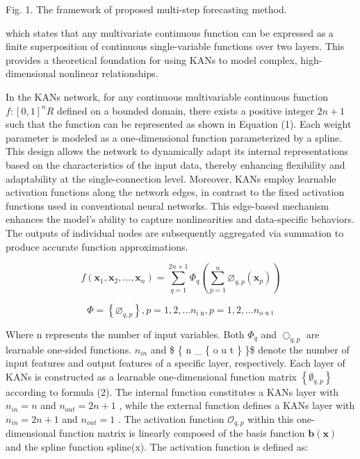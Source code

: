 \documentclass[
  10
]{article}
\begin{document}
Fig. 1. The framework of proposed multi-step forecasting method.

which states that any multivariate continuous function can be expressed
as a finite superposition of continuous single-variable functions over
two layers. This provides a theoretical foundation for using KANs to
model complex, high-dimensional nonlinear relationships.

In the KANs network, for any continuous multivariable continuous
function \(f : [ 0 , 1 ] ^ { n } {  } R\) defined on a bounded domain,
there exists a positive integer \(2 n + 1\) such that the function can
be represented as shown in Equation (1). Each weight parameter is
modeled as a one-dimensional function parameterized by a spline. This
design allows the network to dynamically adapt its internal
representations based on the characteristics of the input data, thereby
enhancing flexibility and adaptability at the single-connection level.
Moreover, KANs employ learnable activation functions along the network
edges, in contrast to the fixed activation functions used in
conventional neural networks. This edge-based mechanism enhances the
model's ability to capture nonlinearities and data-specific behaviors.
The outputs of individual nodes are subsequently aggregated via
summation to produce accurate function approximations.

\[
f \left(\boldsymbol {x} _ {1}, \boldsymbol {x} _ {2}, \dots , \boldsymbol {x} _ {n}\right) = \sum_ {q = 1} ^ {2 n + 1} \Phi_ {q} \left(\sum_ {p = 1} ^ {n} \varnothing_ {q, p} \left(\boldsymbol {x} _ {p}\right)\right) \tag {1}
\]

\[
\Phi = \left\{\varnothing_ {q, p} \right\}, p = 1, 2, \dots n _ {\text {i n}}, p = 1, 2, \dots n _ {\text {o u t}} \tag {2}
\]

Where n represents the number of input variables. Both
\(\varPhi _ { q }\) and \(\textstyle \bigcirc _ { q , p }\) are
learnable one-sided functions. \(n _ { i n }\) and \$ \{ n \_ \{ o u t
\} \}\$ denote the number of input features and output features of a
specific layer, respectively. Each layer of KANs is constructed as a
learnable one-dimensional function matrix
\(\left\{ \emptyset _ { q , p } \right\}\) according to formula (2). The
internal function constitutes a KANs layer with \(n _ { i n } = n\) and
\(n _ { o u t } = 2 n + 1\) , while the external function defines a KANs
layer with \(n _ { i n } = 2 n + 1\) and \(n _ { o u t } = 1\) . The
activation function \(\mathcal { O } _ { q , p }\) within this
one-dimensional function matrix is linearly composed of the basis
function \(\mathbf { b } ( \mathbf { x } )\) and the spline function
spline(x). The activation function is defined as:
\end{document}
